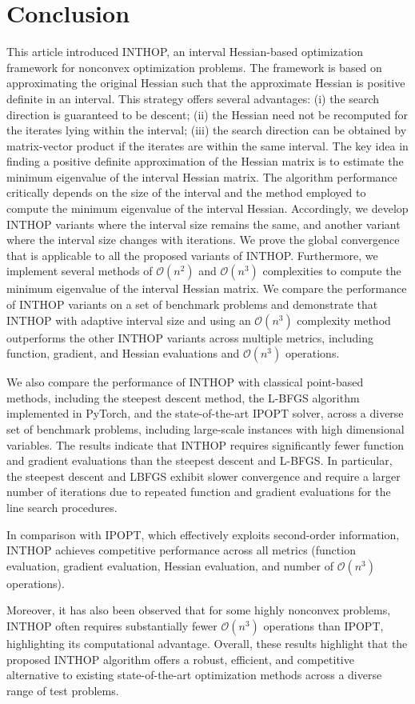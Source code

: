 \documentclass{elsarticle}
\numberwithin{equation}{section}
\begin{document}
\section{Conclusion}
This article introduced INTHOP, an interval Hessian-based optimization framework for nonconvex optimization problems. The framework is based on approximating the original Hessian such that the approximate Hessian is positive definite in an interval. This strategy offers several advantages: (i) the search direction is guaranteed to be descent; (ii) the Hessian need not be recomputed for the iterates lying within the interval; (iii) the search direction can be obtained by matrix-vector product if the iterates are within the same interval. The key idea in finding a positive definite approximation of the Hessian matrix is to estimate the minimum eigenvalue of the interval Hessian matrix. The algorithm performance critically depends on the size of  the interval and the method employed to compute
the minimum eigenvalue of the interval Hessian. Accordingly, we develop INTHOP variants where the interval size remains the same, and another variant where the interval size changes with iterations. We prove the global convergence that is applicable to all the proposed variants of INTHOP.  Furthermore, we implement several methods of $\mathcal{O}(n^2)$ and $\mathcal{O}(n^3)$ complexities to compute the minimum eigenvalue of the interval Hessian matrix. We compare the performance of INTHOP variants on a set of benchmark problems and demonstrate that INTHOP with adaptive interval size and using an $\mathcal{O}(n^3)$ complexity method outperforms the other INTHOP variants across multiple metrics, including function, gradient, and Hessian evaluations and $\mathcal{O}(n^3)$ operations. 

{We also compare the performance of INTHOP with classical point-based methods, including the steepest descent method, the L-BFGS algorithm implemented in PyTorch, and the state-of-the-art IPOPT solver, across a diverse set of benchmark problems, including large-scale instances with high dimensional variables. The results indicate that INTHOP requires significantly fewer function and gradient evaluations than the steepest descent and L-BFGS. In particular, the steepest descent and LBFGS exhibit slower convergence and require a larger number of iterations due to repeated function and gradient evaluations for the line search procedures.

In comparison with IPOPT, which effectively exploits second-order information, INTHOP achieves competitive performance across all metrics (function evaluation, gradient evaluation, Hessian evaluation, and number of $\mathcal{O}(n^{3})$ operations).

Moreover, it has also been observed that for some highly nonconvex problems, INTHOP often requires substantially fewer $\mathcal{O}(n^3)$ operations than IPOPT, highlighting its computational advantage. Overall, these results highlight that the proposed INTHOP algorithm offers a robust, efficient, and competitive alternative to existing state-of-the-art optimization methods across a diverse range of test problems.}
\end{document}
